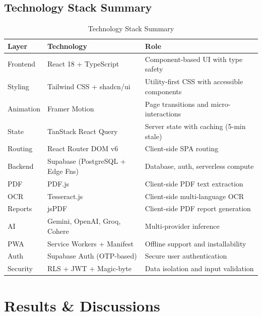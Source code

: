 \documentclass[12pt,a4paper,oneside]{report}
\begin{document}
\section{Technology Stack Summary}

\begin{table}[htbp]
\centering
\caption{Technology Stack Summary}
\label{tab:techstack}
\small
\begin{tabular}{|p{2.5cm}|p{4.5cm}|p{5cm}|}
\hline
\textbf{Layer} & \textbf{Technology} & \textbf{Role} \\
\hline
Frontend & React 18 + TypeScript & Component-based UI with type safety \\ \hline
Styling & Tailwind CSS + shadcn/ui & Utility-first CSS with accessible components \\ \hline
Animation & Framer Motion & Page transitions and micro-interactions \\ \hline
State & TanStack React Query & Server state with caching (5-min stale) \\ \hline
Routing & React Router DOM v6 & Client-side SPA routing \\ \hline
Backend & Supabase (PostgreSQL + Edge Fns) & Database, auth, serverless compute \\ \hline
PDF & PDF.js & Client-side PDF text extraction \\ \hline
OCR & Tesseract.js & Client-side multi-language OCR \\ \hline
Reports & jsPDF & Client-side PDF report generation \\ \hline
AI & Gemini, OpenAI, Groq, Cohere & Multi-provider inference \\ \hline
PWA & Service Workers + Manifest & Offline support and installability \\ \hline
Auth & Supabase Auth (OTP-based) & Secure user authentication \\ \hline
Security & RLS + JWT + Magic-byte & Data isolation and input validation \\ \hline
\end{tabular}
\end{table}

\chapter{Results \& Discussions}
\end{document}
